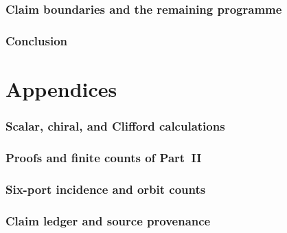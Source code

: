 \documentclass[11pt]{article}
\theoremstyle{definition}
\theoremstyle{remark}
\begin{document}
\section{Claim boundaries and the remaining programme}\label{sec:boundaries}

\section{Conclusion}\label{sec:conclusion}


\appendix
\part*{Appendices}

\section{Scalar, chiral, and Clifford calculations}\label{app:scalar-clifford}

\section{Proofs and finite counts of Part~II}\label{app:proofs}

\section{Six-port incidence and orbit counts}\label{app:six-port-counts}

\section{Claim ledger and source provenance}\label{app:ledger}




\end{document}
